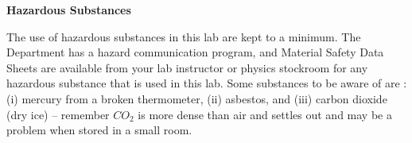 \begin{enumerate}
{\Large \item \textbf{Hazardous Substances}}

The use of hazardous substances in this lab are kept to a minimum. The Department has a hazard communication program, and Material Safety Data Sheets are available from your lab instructor or physics stockroom for any hazardous substance that is used in this lab. Some substances to be aware of are : (i) mercury from a broken thermometer, (ii) asbestos, and (iii) carbon dioxide (dry ice) -- remember $CO_2$ is more dense than air and settles out and may be a problem when stored in a small room.

\end{enumerate}

\endinput